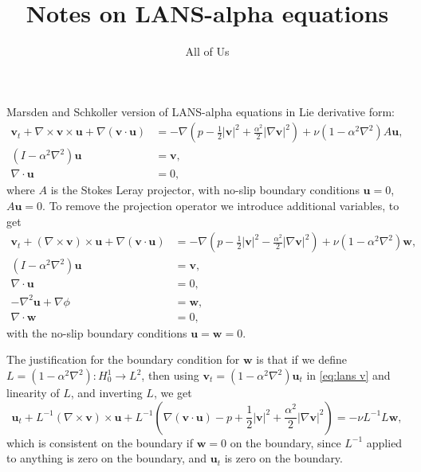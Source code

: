 \documentclass{article}
\def\MM#1{\boldsymbol{#1}}
\def\MM#1{\boldsymbol{#1}}
\begin{document}
\title{Notes on LANS-alpha equations}
\author{All of Us}
\maketitle

Marsden and Schkoller version of LANS-alpha equations in Lie
derivative form:
\begin{align}
  \MM{v}_t + \nabla\times \MM{v}\times \MM{u} + \nabla(\MM{v}\cdot\MM{u})
  &= -\nabla \left(p - \frac{1}{2}|\MM{v}|^2 + \frac{\alpha^2}{2}|\nabla\MM{v}|^2\right) + \nu (1-\alpha^2\nabla^2)A\MM{u}, \\
  (I - \alpha^2\nabla^2)\MM{u} & = \MM{v}, \\
  \nabla\cdot\MM{u} & = 0,
\end{align}
where $A$ is the Stokes Leray projector, with no-slip boundary
conditions $\MM{u}=0$, $A\MM{u}=0$. To remove the projection operator we
introduce additional variables, to get
\begin{align}
  \label{eq:lans v}
  \MM{v}_t + (\nabla\times \MM{v})\times \MM{u} + \nabla(\MM{v}\cdot\MM{u})
  &= -\nabla \left(p - \frac{1}{2}|\MM{v}|^2 - \frac{\alpha^2}{2}|\nabla\MM{v}|^2\right) + \nu (1-\alpha^2\nabla^2)\MM{w}, \\
  (I - \alpha^2\nabla^2)\MM{u} & = \MM{v}, \\
  \nabla\cdot\MM{u} & = 0, \\
  -\nabla^2 \MM{u} + \nabla \phi & = \MM{w}, \\
  \nabla\cdot\MM{w} & = 0,
\end{align}
with the no-slip boundary conditions $\MM{u}=\MM{w}=0$.

The justification for the boundary condition for $\MM{w}$ is that if
we define $L = (1-\alpha^2\nabla^2):H^1_0\to L^2$, then using
$\MM{v}_t=(1-\alpha^2\nabla^2)\MM{u}_t$ in \eqref{eq:lans v} and
linearity of $L$, and inverting $L$, we get
\begin{equation}
  \MM{u}_t + L^{-1}(\nabla\times \MM{v})\times \MM{u} +
  L^{-1}\left(\nabla(\MM{v}\cdot\MM{u}) - p + \frac{1}{2}|\MM{v}|^2 + \frac{\alpha^2}{2}|\nabla\MM{v}|^2\right) = -\nu L^{-1}L\MM{w},
\end{equation}
which is consistent on the boundary if $\MM{w}=0$ on the boundary,
since $L^{-1}$ applied to anything is zero on the boundary, and
$\MM{u}_t$ is zero on the boundary.
\end{document}
